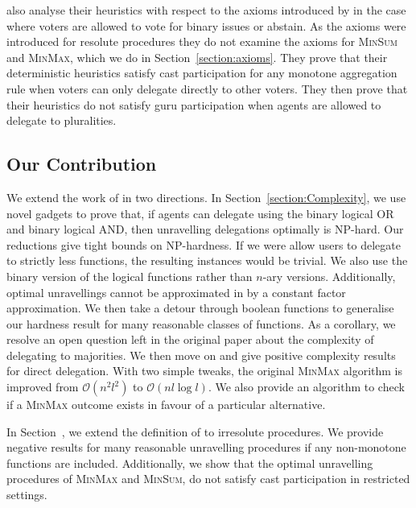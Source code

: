\documentclass[11pt,a4paper, titlepage]{article}
\theoremstyle{definition}
\begin{document}
\citeauthor{grandi} also analyse their heuristics with respect to the axioms introduced by \citeauthor{kotsialou} in the case where voters are allowed to vote for binary issues or abstain. 
As the axioms were introduced for resolute procedures they do not examine the axioms for \textsc{MinSum} and \textsc{MinMax}, which we do in Section~\ref{section:axioms}.
They prove that their deterministic heuristics satisfy cast participation for any monotone aggregation rule when voters can only delegate directly to other voters.
They then prove that their heuristics do not satisfy guru participation when agents are allowed to delegate to pluralities.

\subsection{Our Contribution}

We extend the work of \citeauthor{grandi} in two directions. 
In Section~\ref{section:Complexity}, we use novel gadgets to prove that, if agents can delegate using the binary logical OR and binary logical AND, then unravelling delegations optimally is NP-hard.
Our reductions give tight bounds on NP-hardness.
If we were allow users to delegate to strictly less functions, the resulting instances would be trivial.
We also use the binary version of the logical functions rather than $n$-ary versions.
Additionally, optimal unravellings cannot be approximated in by a constant factor approximation.
We then take a detour through boolean functions to generalise our hardness result for many reasonable classes of functions. 
As a corollary, we resolve an open question left in the original paper about the complexity of delegating to majorities.
We then move on and give positive complexity results for direct delegation.
With two simple tweaks, the original \textsc{MinMax} algorithm is improved from $\mathcal{O}(n^2l^2)$ to $\mathcal{O}(nl \log l)$.
We also provide an algorithm to check if a \textsc{MinMax} outcome exists in favour of a particular alternative.

In Section~, we extend the definition of \citet{kotsialou} to irresolute procedures.
We provide negative results for many reasonable unravelling procedures if any non-monotone functions are included.
Additionally, we show that the optimal unravelling procedures of \textsc{MinMax} and \textsc{MinSum}, do not satisfy cast participation in restricted settings.


\newpage
\end{document}
